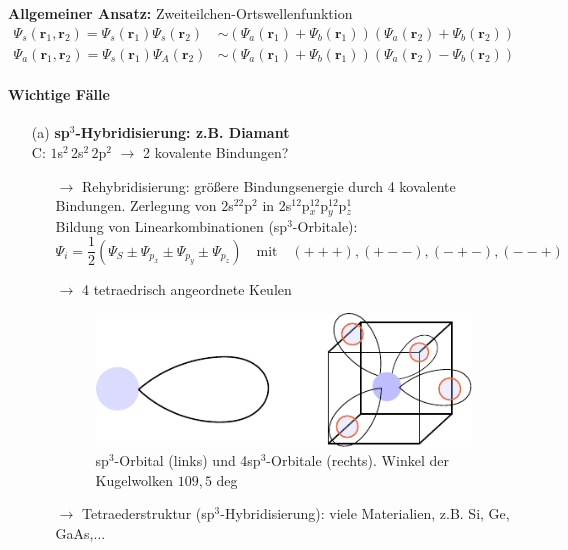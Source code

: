\textbf{Allgemeiner Ansatz:} Zweiteilchen-Ortswellenfunktion
\begin{align*}
	\Psi_s(\textbf{r}_1,\textbf{r}_2) = \Psi_s(\textbf{r}_1) \Psi_s(\textbf{r}_2) &\sim (\Psi_a(\textbf{r}_1) + \Psi_b(\textbf{r}_1)) (\Psi_a(\textbf{r}_2) + \Psi_b (\textbf{r}_2))\\
	\Psi_a(\textbf{r}_1,\textbf{r}_2) = \Psi_s(\textbf{r}_1) \Psi_A(\textbf{r}_2) &\sim (\Psi_a(\textbf{r}_1) + \Psi_b(\textbf{r}_1)) (\Psi_a(\textbf{r}_2) - \Psi_b (\textbf{r}_2))
\end{align*}

\paragraph{Wichtige Fälle}
\begin{itemize}
	\item[(a)] \textbf{sp$^3$-Hybridisierung: z.B. Diamant}\\
	C: $1$s$^2 \, 2$s$^2 \, 2$p$^2$ $\rightarrow$ 2 kovalente Bindungen?\\
	\begin{itemize}
		\item[$\rightarrow$] Rehybridisierung: größere Bindungsenergie durch 4 kovalente Bindungen. Zerlegung von $2$s$^22$p$^2$ in $2$s$^12$p$_x^12$p$_y^12$p$_z^1$\\
		Bildung von Linearkombinationen (sp$^3$-Orbitale):\\
		$$\Psi_i = \frac{1}{2} (\Psi_S \pm \Psi_{p_x} \pm \Psi_{p_y} \pm \Psi_{p_z}) \quad \text{mit} \quad (+++), (+--), (-+-), (--+)$$
		\item [$\rightarrow$] 4 tetraedrisch angeordnete Keulen\\
		\begin{figure}[H]
			\centering
			\includegraphics{figures/1_4bindungen.pdf}
			\caption{sp$^3$-Orbital (links) und 4sp$^3$-Orbitale (rechts). Winkel der Kugelwolken $109,5$ deg }
			\label{}
		\end{figure}
		\item[$\rightarrow$] Tetraederstruktur (sp$^3$-Hybridisierung): viele Materialien, z.B. Si, Ge, GaAs,...

\end{itemize}
\end{itemize}
